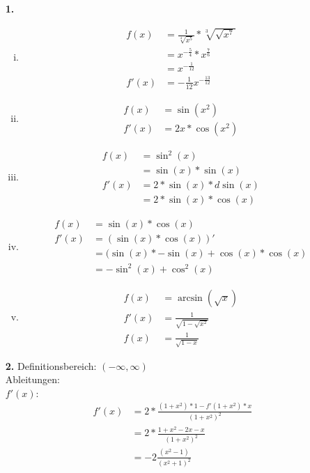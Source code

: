 \documentclass[a4paper]{scrartcl}
\title{\titleinfo}
\author{Elena Noll, Sven-Hendrik Haase, Arne Struck}
\date{\today}
\begin{document}
\maketitle

\begin{enumerate}

\item[\textbf{1.}]
\begin{enumerate}[(i)]

\item
\begin{align}
f(x) &= \frac{1}{\sqrt[4]{x^5}} * \sqrt[3]{\sqrt{x^7}} \\
&= x^{-\frac{5}{4}} * x^{\frac{7}{6}}\\
&= x^{-\frac{1}{12}}\\  	 
f'(x) &= -\frac{1}{12} x^{-\frac{13}{12}}
\end{align}
\item
\begin{align}
f(x) &= \sin(x^2) \\
f'(x)&= 2x*\cos(x^2)
\end{align}
\item
\begin{align}
f(x) &= \sin^2(x) \\
&= \sin(x)*\sin(x) \\
f'(x) &= 2*\sin(x)*d \sin(x)\\
&= 2*\sin(x)*\cos(x)
\end{align}
\item
\begin{align}
f(x) &= \sin(x)*\cos(x)\\
f'(x) &= (\sin(x)*\cos(x))'\\
&= (\sin(x)*-\sin(x)+\cos(x)*\cos(x)\\
&= -\sin^2(x)+\cos^2(x)
\end{align}
\item
\begin{align}
f(x) &= \arcsin(\sqrt{x}) \\
f'(x) &= \frac{1}{\sqrt{1-\sqrt{x^2}}} \\
f(x) &= \frac{1}{\sqrt{1-x}}
\end{align}
\end{enumerate}


\item[\textbf{2.}]
Definitionsbereich: \((-\infty,\infty)\)\\
Ableitungen:\\

\(f'(x)\):
\begin{align}
f'(x)&=2*\frac {(1+x^2)*1-f'(1+x^2)*x} {(1+x^2)^2}\\
&=2*\frac {1+x^2-2x-x} {(1+x^2)^2}\\
&=-2\frac {(x^2-1)} {(x^2+1)^2}
\end{align}


\end{enumerate}
\end{document}
